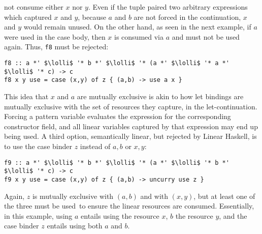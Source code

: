 \documentclass[acmsmall,review,screen]{acmart}
\newcommand{\incode}[1]{\lstinline{#1}}
\newcommand{\lolli}{\multimap}
\newcommand{\ROUNDTWO}[1]{{\color{red}#1}}
\begin{document}
not consume either $x$ \ROUNDTWO{nor} $y$. Even if the tuple \ROUNDTWO{paired}
two \ROUNDTWO{arbitrary} expressions which \ROUNDTWO{captured} $x$ and $y$,
\ROUNDTWO{because $a$ and $b$ are not forced in the continuation, $x$ and $y$ would remain unused.}
\ROUNDTWO{On the other hand, as seen in the next example}, if $a$ were used in 
the case body, then $x$ \ROUNDTWO{is consumed via $a$ and must not be used again.}
Thus, \incode{f8} must be rejected:
\begin{noway}
\begin{lstlisting}
f8 :: a *' $\lolli$ '* b *' $\lolli$ '* (a *' $\lolli$ '* a *' $\lolli$ '* c) -> c
f8 x y use = case (x,y) of z { (a,b) -> use a x }
\end{lstlisting}
\end{noway}
This idea that $x$ and $a$ are mutually exclusive is \ROUNDTWO{akin to how} let
bindings \ROUNDTWO{are} mutually exclusive \ROUNDTWO{with the set} of resources
\ROUNDTWO{they capture, in the let-continuation}.
\ROUNDTWO{Forcing a pattern variable evaluates the expression for the
corresponding constructor field, and all linear variables captured by that
expression may end up being used}.
%
A third option, semantically \ROUNDTWO{linear}, but rejected by Linear Haskell, is to use
the case binder $z$ instead of $a,b$ or $x,y$:
\begin{notyet}
\begin{lstlisting}
f9 :: a *' $\lolli$ '* b *' $\lolli$ '* (a *' $\lolli$ '* b *' $\lolli$ '* c) -> c
f9 x y use = case (x,y) of z { (a,b) -> uncurry use z }
\end{lstlisting}
\end{notyet}
Again, $z$ is mutually exclusive with $(a,b)$ and with $(x,y)$, but at least
one of the three must \ROUNDTWO{be used} to ensure the
linear resources are consumed. Essentially, in this example, using $a$ entails
using the resource $x$, $b$ the resource $y$, and the case binder $z$ entails
using both $a$ and $b$.
\end{document}

